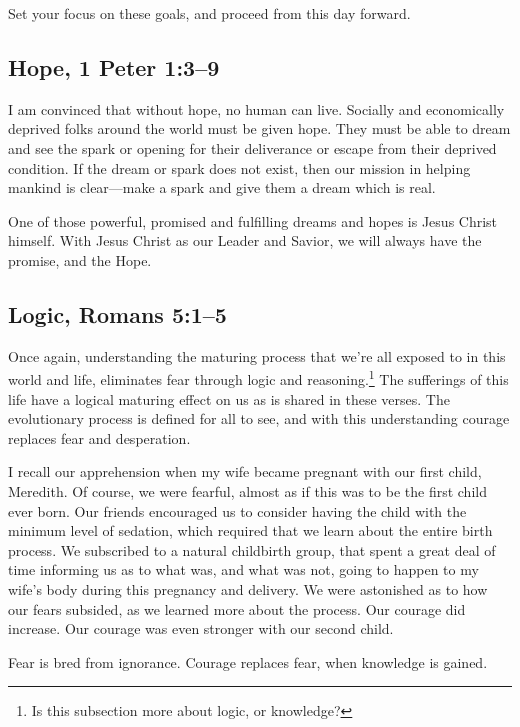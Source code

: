 \documentclass[12pt]{memoir}
\begin{document}
Set your focus on these goals, and proceed from this day forward.

\subsection[Hope]{Hope, 1 Peter 1:3--9}

I am convinced that without hope, no human can live. Socially
and economically deprived folks around the world must be given hope.
They must be able to dream and see the spark or opening for their deliverance or escape from their deprived condition. If
the dream or spark does not exist, then our mission in helping mankind
is clear---make a spark and give them a dream which is real.

One of those powerful, promised and fulfilling dreams and hopes is
Jesus Christ himself. With Jesus Christ as our Leader and Savior, we will
always have the promise, and the Hope.

\subsection[Logic]{Logic, Romans 5:1--5}

Once again, understanding the maturing process that we're all exposed
to in this world and life, eliminates fear through logic and reasoning.\footnote{Is this subsection more about logic, or knowledge?}
The sufferings of this life have a logical maturing effect on
us as is shared in these verses. The evolutionary process is defined
for all to see, and with this understanding courage replaces fear
and desperation.

I recall our apprehension when my wife became pregnant with our first
child, Meredith. Of course, we were fearful, almost as if this was
to be the first child ever born. Our friends encouraged us to consider
having the child with the minimum level of sedation, which required
that we learn about the entire birth process. We subscribed to a natural
childbirth group, that spent a great deal of time informing us as
to what was, and what was not, going to happen to my wife's body during
this pregnancy and delivery. We were astonished as to how our fears
subsided, as we learned more about the process. Our courage did increase.
Our courage was even stronger with our second child.

Fear is bred from ignorance. Courage replaces fear, when knowledge
is gained.
\end{document}
